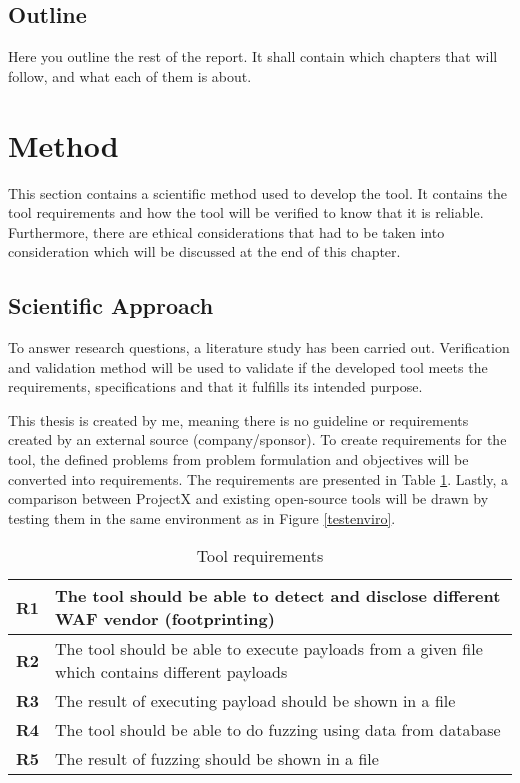 \documentclass[a4paper,12pt]{article}
\begin{document}
\subsection{Outline}
{\color{red}
Here you outline the rest of the report. It shall contain which chapters that will follow, and what each of them is about.}\label{Method}


\newpage

\section{Method}
\label{Method}
This section contains a scientific method used to develop the tool. It contains the tool requirements and how the tool will be verified to know that it is reliable. Furthermore, there are ethical considerations that had to be taken into consideration which will be discussed at the end of this chapter.

\subsection{Scientific Approach}
To answer research questions, a literature study has been carried out. Verification and validation method will be used to validate if the developed tool meets the requirements, specifications and that it fulfills its intended purpose.

This thesis is created by me, meaning there is no guideline or requirements created by an external source (company/sponsor). To create requirements for the tool, the defined
problems from problem formulation and objectives will be converted into requirements.  The requirements are presented in Table \ref{rq}. Lastly, a comparison between ProjectX and existing open-source tools will be drawn by testing them in the same environment as in Figure \ref{testenviro}.

\begin{table}[ht]
    \centering
   \begin{tabular} {|p{1.2cm}|p{10.6cm}|} \hline
    \textbf{R1} & The tool should be able to detect and disclose different WAF vendor (footprinting) \\ \hline
    \textbf{R2} & The tool should be able to execute payloads from a given file which contains different payloads \\ \hline
    \textbf{R3} & The result of executing payload should be shown in a file \\ \hline
    \textbf{R4} & The tool should be able to do fuzzing using data from database \\ \hline
    \textbf{R5} & The result of fuzzing should be shown in a file\\ \hline
    \end{tabular}
    \caption{Tool requirements}
    \label{rq}
\end{table}{}
\end{document}
